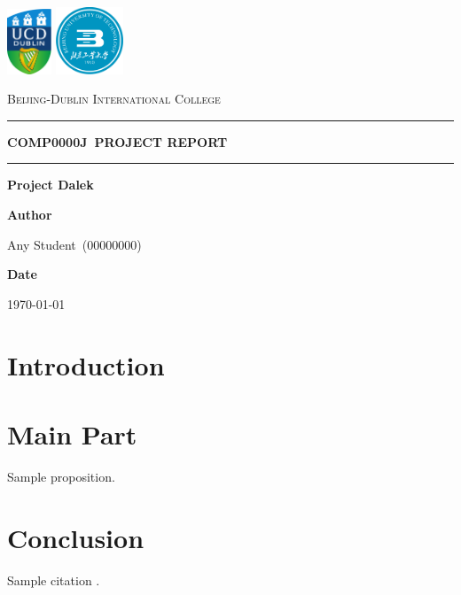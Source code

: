 \documentclass{article}
\newcommand{\name}{Any Student}
\newcommand{\idnumber}{00000000}
\newcommand{\coursecode}{COMP0000J}
\newcommand{\HRule}[1]{\rule{\linewidth}{#1}}
\begin{document}
\begin{titlepage}
    \centering
    \vspace*{1cm}
    \includegraphics[width=0.1\textwidth]{images/UCD_Logo.pdf} \hspace{0.5cm}
    \includegraphics[width=0.15\textwidth]{images/BJUT_Logo.pdf} \par
    \vspace{0.8cm}
    {\Large \textsc{Beijing-Dublin International College}} \par
    \vspace{1.5cm}
    \HRule{0.2pt} \par
    \vspace{0.5cm}
    {\huge \textbf{\uppercase{\coursecode \ Project Report}}} \par
    \vspace{0cm}
    \HRule{0.2pt} \par
    \vspace{1.0cm}
    {\LARGE \textbf{Project Dalek}} \par
    \vspace{8cm}
    \textbf{Author} \par
    \name \ (\idnumber) \par
    \vspace{1cm}
    \textbf{Date} \par
    \today \par
    \vfill
\end{titlepage}

\tableofcontents
\newpage

\begin{abstract}
\end{abstract}

\section{Introduction}

\section{Main Part}
    \begin{proposition}
        Sample proposition.
    \end{proposition}

\section{Conclusion}
    Sample citation \cite{Smith_2012}.



\end{document}
